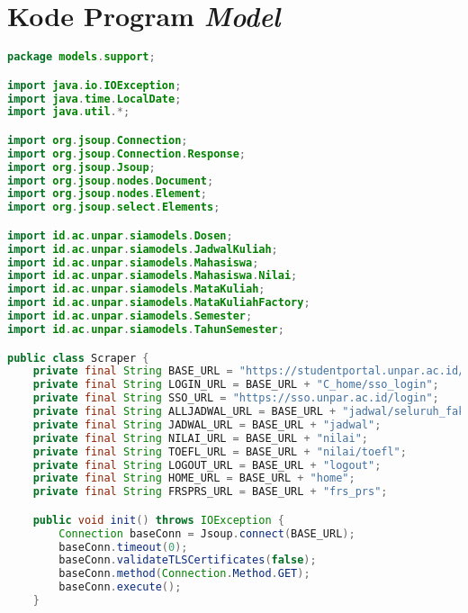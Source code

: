 \chapter{Kode Program \textit{Model}}
\label{lamp:B}

\singlespacing

\begin{lstlisting}[language=Java,basicstyle=\tiny,caption=Scraper.java]
package models.support;

import java.io.IOException;
import java.time.LocalDate;
import java.util.*;

import org.jsoup.Connection;
import org.jsoup.Connection.Response;
import org.jsoup.Jsoup;
import org.jsoup.nodes.Document;
import org.jsoup.nodes.Element;
import org.jsoup.select.Elements;

import id.ac.unpar.siamodels.Dosen;
import id.ac.unpar.siamodels.JadwalKuliah;
import id.ac.unpar.siamodels.Mahasiswa;
import id.ac.unpar.siamodels.Mahasiswa.Nilai;
import id.ac.unpar.siamodels.MataKuliah;
import id.ac.unpar.siamodels.MataKuliahFactory;
import id.ac.unpar.siamodels.Semester;
import id.ac.unpar.siamodels.TahunSemester;

public class Scraper {
	private final String BASE_URL = "https://studentportal.unpar.ac.id/";
	private final String LOGIN_URL = BASE_URL + "C_home/sso_login";
	private final String SSO_URL = "https://sso.unpar.ac.id/login";
	private final String ALLJADWAL_URL = BASE_URL + "jadwal/seluruh_fakultas";
	private final String JADWAL_URL = BASE_URL + "jadwal";
	private final String NILAI_URL = BASE_URL + "nilai";
	private final String TOEFL_URL = BASE_URL + "nilai/toefl";
	private final String LOGOUT_URL = BASE_URL + "logout";
	private final String HOME_URL = BASE_URL + "home";
	private final String FRSPRS_URL = BASE_URL + "frs_prs";

	public void init() throws IOException {
		Connection baseConn = Jsoup.connect(BASE_URL);
		baseConn.timeout(0);
		baseConn.validateTLSCertificates(false);
		baseConn.method(Connection.Method.GET);
		baseConn.execute();
	}


\end{lstlisting}
